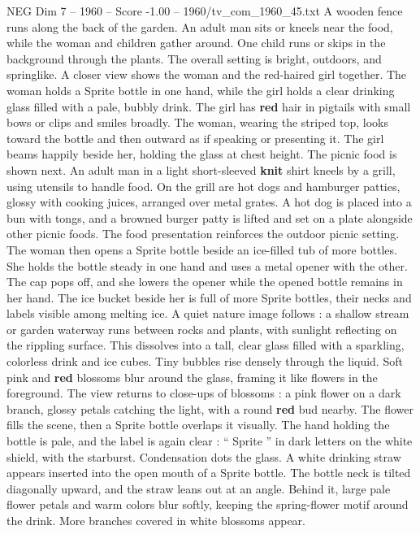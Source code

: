 \begin{textsample}{NEG Dim 7 – 1960 – Score -1.00 – 1960/tv\_com\_1960\_45.txt}
A wooden fence runs along the back of the garden.
An adult man sits or kneels near the food, while the woman and children gather around.
One child runs or skips in the background through the plants.
The overall setting is bright, outdoors, and springlike.
A closer view shows the woman and the red-haired girl together.
The woman holds a Sprite bottle in one hand, while the girl holds a clear drinking glass filled with a pale, bubbly drink.
The girl has \textbf{red} hair in pigtails with small bows or clips and smiles broadly.
The woman, wearing the striped top, looks toward the bottle and then outward as if speaking or presenting it.
The girl beams happily beside her, holding the glass at chest height.
The picnic food is shown next.
An adult man in a light short-sleeved \textbf{knit} shirt kneels by a grill, using utensils to handle food.
On the grill are hot dogs and hamburger patties, glossy with cooking juices, arranged over metal grates.
A hot dog is placed into a bun with tongs, and a browned burger patty is lifted and set on a plate alongside other picnic foods.
The food presentation reinforces the outdoor picnic setting.
The woman then opens a Sprite bottle beside an ice-filled tub of more bottles.
She holds the bottle steady in one hand and uses a metal opener with the other.
The cap pops off, and she lowers the opener while the opened bottle remains in her hand.
The ice bucket beside her is full of more Sprite bottles, their necks and labels visible among melting ice.
A quiet nature image follows : a shallow stream or garden waterway runs between rocks and plants, with sunlight reflecting on the rippling surface.
This dissolves into a tall, clear glass filled with a sparkling, colorless drink and ice cubes.
Tiny bubbles rise densely through the liquid.
Soft pink and \textbf{red} blossoms blur around the glass, framing it like flowers in the foreground.
The view returns to close-ups of blossoms : a pink flower on a dark branch, glossy petals catching the light, with a round \textbf{red} bud nearby.
The flower fills the scene, then a Sprite bottle overlaps it visually.
The hand holding the bottle is pale, and the label is again clear : “ Sprite ” in dark letters on the white shield, with the starburst.
Condensation dots the glass.
A white drinking straw appears inserted into the open mouth of a Sprite bottle.
The bottle neck is tilted diagonally upward, and the straw leans out at an angle.
Behind it, large pale flower petals and warm colors blur softly, keeping the spring-flower motif around the drink.
More branches covered in white blossoms appear.

\end{textsample}
